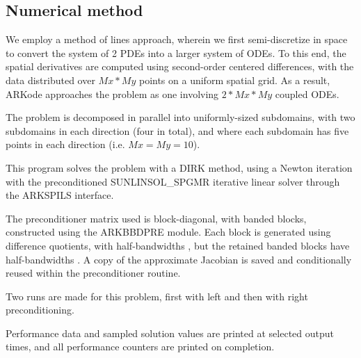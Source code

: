 \documentclass[letterpaper,10pt,english]{sphinxmanual}
\begin{document}
\subsection{Numerical method}
\label{\detokenize{c_parallel:numerical-method}}
We employ a method of lines approach, wherein we first
semi-discretize in space to convert the system of 2 PDEs into a larger
system of ODEs.  To this end, the spatial derivatives are computed
using second-order centered differences, with the data distributed
over \(Mx*My\) points on a uniform spatial grid.  As a result, ARKode
approaches the problem as one involving \(2*Mx*My\) coupled ODEs.

The problem is decomposed in parallel into uniformly-sized subdomains,
with two subdomains in each direction (four in total), and where each
subdomain has five points in each direction (i.e. \(Mx=My=10\)).

This program solves the problem with a DIRK method, using a Newton
iteration with the preconditioned SUNLINSOL\_SPGMR iterative linear
solver through the ARKSPILS interface.

The preconditioner matrix used is block-diagonal, with banded blocks,
constructed using the ARKBBDPRE module.  Each block is generated using
difference quotients, with half-bandwidths , but
the retained banded blocks have half-bandwidths .
A copy of the approximate Jacobian is saved and conditionally reused
within the preconditioner routine.

Two runs are made for this problem, first with left and then with
right preconditioning.

Performance data and sampled solution values are printed at
selected output times, and all performance counters are printed
on completion.
\end{document}
